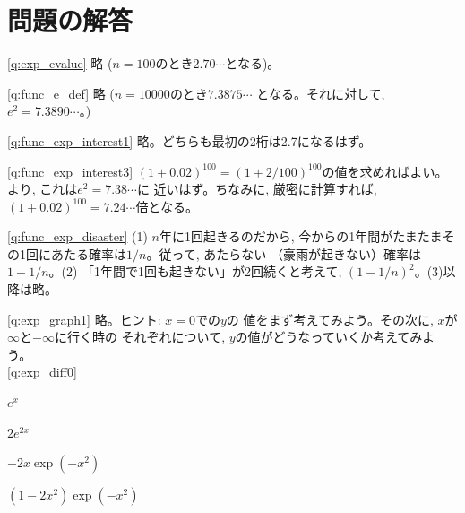 \section*{問題の解答}



\ref{q:exp_evalue} 略 ($n=100$のとき$2.70\cdots$となる)。
\mv

\mv

\ref{q:func_e_def} 略 ($n=10000$のとき$7.3875\cdots$
となる。それに対して, $e^2=7.3890\cdots$。)
\mv

\ref{q:func_exp_interest1} 略。どちらも最初の2桁は2.7になるはず。\mv

\ref{q:func_exp_interest3} 
$(1+0.02)^{100}=(1+2/100)^{100}$の値を求めればよい。
より, これは$e^2=7.38\cdots$に
近いはず。ちなみに, 厳密に計算すれば, $(1+0.02)^{100}=7.24\cdots$倍となる。
\mv

\ref{q:func_exp_disaster} (1) $n$年に1回起きるのだから, 
今からの1年間がたまたまその1回にあたる確率は$1/n$。従って, あたらない
（豪雨が起きない）確率は$1-1/n$。(2) 「1年間で1回も起きない」が2回続くと考えて, 
$(1-1/n)^2$。(3)以降は略。\mv


\ref{q:exp_graph1} 略。ヒント: $x=0$での$y$の
値をまず考えてみよう。その次に, $x$が$\infty$と$-\infty$に行く時の
それぞれについて, $y$の値がどうなっていくか考えてみよう。\\

\ref{q:exp_diff0} 
\begin{edaenumerate}
\item $e^x$
\item $2e^{2x}$
\item $-2x\exp(-x^2)$
\item $(1-2x^2)\exp(-x^2)$
\end{edaenumerate}
\mv

